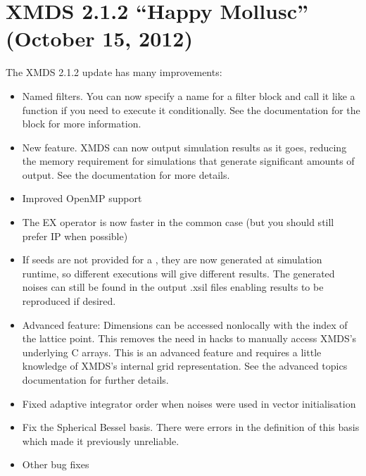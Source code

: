 \documentclass[letterpaper,10pt,english]{sphinxmanual}
\begin{document}
\section{XMDS 2.1.2 “Happy Mollusc” (October 15, 2012)}
\label{\detokenize{news:xmds-2-1-2-happy-mollusc-october-15-2012}}
\sphinxAtStartPar
The XMDS 2.1.2 update has many improvements:
\begin{itemize}
\item {} 
\sphinxAtStartPar
Named filters.  You can now specify a name for a filter block and call it like a function if you need to execute it conditionally.  See the documentation for the  block for more information.

\item {} 
\sphinxAtStartPar
New  feature.  XMDS can now output simulation results as it goes, reducing the memory requirement for simulations that generate significant amounts of output.  See the documentation for more details.

\item {} 
\sphinxAtStartPar
Improved OpenMP support

\item {} 
\sphinxAtStartPar
The EX operator is now faster in the common case (but you should still prefer IP when possible)

\item {} 
\sphinxAtStartPar
If seeds are not provided for a , they are now generated at simulation run\sphinxhyphen{}time, so different executions will give different results.  The generated noises can still be found in the output .xsil files enabling results to be reproduced if desired.

\item {} 
\sphinxAtStartPar
Advanced feature: Dimensions can be accessed non\sphinxhyphen{}locally with the index of the lattice point.  This removes the need in hacks to manually access XMDS’s underlying C arrays.  This is an advanced feature and requires a little knowledge of XMDS’s internal grid representation.  See the advanced topics documentation for further details.

\item {} 
\sphinxAtStartPar
Fixed adaptive integrator order when noises were used in vector initialisation

\item {} 
\sphinxAtStartPar
Fix the Spherical Bessel basis.  There were errors in the definition of this basis which made it previously unreliable.

\item {} 
\sphinxAtStartPar
Other bug fixes

\end{itemize}
\end{document}
